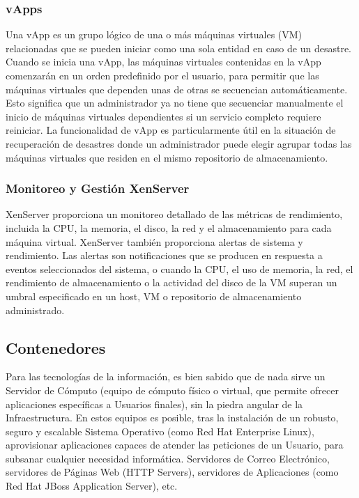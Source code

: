 \documentclass[preprint,12pt]{elsarticle}
\begin{document}
\subsubsection{\textbf{vApps}}
Una vApp es un grupo lógico de una o más máquinas virtuales (VM) relacionadas que se pueden iniciar como una sola entidad en caso de un desastre. Cuando se inicia una vApp, las máquinas virtuales contenidas en la vApp comenzarán en un orden predefinido por el usuario, para permitir que las máquinas virtuales que dependen unas de otras se secuencian automáticamente. Esto significa que un administrador ya no tiene que secuenciar manualmente el inicio de máquinas virtuales dependientes si un servicio completo requiere reiniciar.  La funcionalidad de vApp es particularmente útil en la situación de recuperación de desastres donde un administrador puede elegir agrupar todas las máquinas virtuales que residen en el mismo repositorio de almacenamiento.

\subsubsection{\textbf{Monitoreo y Gestión XenServer}}
XenServer proporciona un monitoreo detallado de las métricas de rendimiento, incluida la CPU, la memoria, el disco, la red  y el almacenamiento para cada máquina virtual.
XenServer también proporciona alertas de sistema y rendimiento. Las alertas son notificaciones que se producen en respuesta a eventos seleccionados del sistema, o cuando la CPU, el uso de memoria, la red, el rendimiento de almacenamiento o la actividad del disco de la VM superan un umbral especificado en un host, VM o repositorio de almacenamiento administrado.\cite{Citrix2018}


\subsection{\textbf{Contenedores}}
Para las tecnologías de la información, es bien sabido que de nada sirve un Servidor de Cómputo (equipo de cómputo físico o virtual, que permite ofrecer aplicaciones específicas a Usuarios finales), sin la piedra angular de la Infraestructura. En estos equipos es posible, tras la instalación de un robusto, seguro y escalable Sistema Operativo (como Red Hat Enterprise Linux), aprovisionar aplicaciones capaces de atender las peticiones de un Usuario, para subsanar cualquier necesidad informática. Servidores de Correo Electrónico, servidores de Páginas Web (HTTP Servers), servidores de Aplicaciones (como Red Hat JBoss Application Server), etc.
\end{document}
